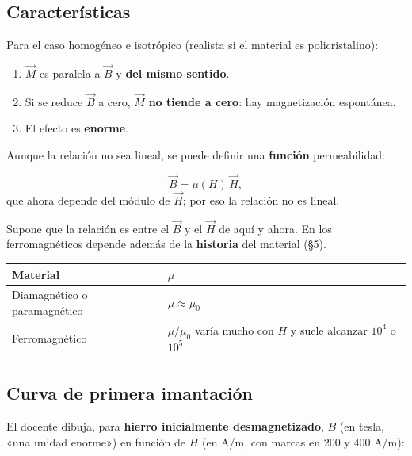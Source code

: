\documentclass[12pt,a4paper]{article}
\begin{document}
\subsection{Características}

Para el caso homogéneo e isotrópico (realista si el material es
policristalino):

\begin{enumerate}
  \item $\vec M$ es paralela a $\vec B$ y \textbf{del mismo sentido}.
  \item Si se reduce $\vec B$ a cero, $\vec M$ \textbf{no tiende a cero}: hay
  magnetización espontánea.
  \item El efecto es \textbf{enorme}.
\end{enumerate}

Aunque la relación no sea lineal, se puede definir una \textbf{función}
permeabilidad:

\[
\vec B = \mu(H)\,\vec H,
\]
que ahora depende del módulo de $\vec H$; por eso la relación no es lineal.

\begin{warnbox}
Supone que la relación es entre el
$\vec B$ y el $\vec H$ de aquí y ahora. En los ferromagnéticos depende
además de la \textbf{historia} del material (§5).
\end{warnbox}

\begin{center}
\renewcommand{\arraystretch}{1.35}
\small
\begin{tabularx}{\textwidth}{>{\raggedright\arraybackslash}X>{\raggedright\arraybackslash}X}
\toprule
\textbf{Material} & \textbf{$\mu$} \\
\midrule
Diamagnético o paramagnético & $\mu\approx\mu_0$ \\
Ferromagnético & $\mu/\mu_0$ varía mucho con $H$ y suele alcanzar $10^4$ o $10^5$ \\
\bottomrule
\end{tabularx}
\end{center}

\subsection{Curva de primera imantación}

El docente dibuja, para \textbf{hierro inicialmente desmagnetizado}, $B$ (en tesla,
«una unidad enorme») en función de $H$ (en A/m, con marcas en 200 y 400 A/m):
\end{document}
